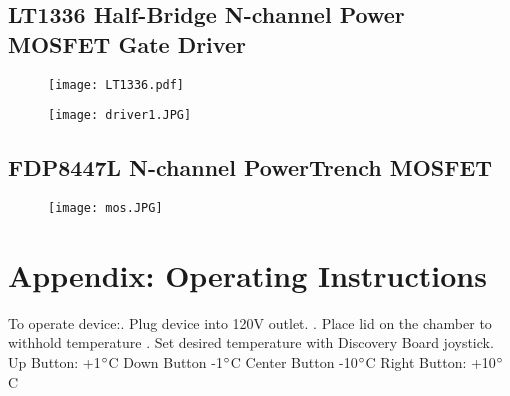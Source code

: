 \documentclass[11pt,letter]{article}
\begin{document}
\newpage




\subsection{LT1336 Half-Bridge N-channel Power MOSFET Gate Driver}

\begin{figure}[H]
    \centering
    \texttt{[image: LT1336.pdf]}
\end{figure}

\begin{figure}[H]
    \centering
    \texttt{[image: driver1.JPG]}
\end{figure}

\newpage

%

\subsection{FDP8447L N-channel PowerTrench MOSFET}

\begin{figure}[H]
    \centering
    \texttt{[image: mos.JPG]}
\end{figure}


%

\section{Appendix: Operating Instructions}

To operate device:. Plug device into 120V outlet. . Place lid on the chamber to withhold temperature . Set desired temperature with Discovery Board joystick. \newline
Up Button: +1$\degree$C \newline
Down Button    -1$\degree$C\newline
Center Button  -10$\degree$C\newline
Right Button:	  +10$\degree$C
\end{document}
